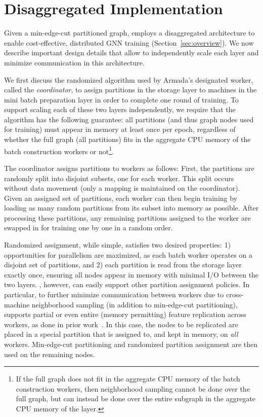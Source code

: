 \section{Disaggregated Implementation}
\label{sec:implementation}
Given a min-edge-cut partitioned graph, \systemname employs a disaggregated architecture to enable cost-effective, distributed GNN training (Section~\ref{sec:overview}). We now describe important design details that allow \systemname to independently scale each layer and minimize communication in this architecture. 



We first discuss the randomized algorithm used by Armada's designated worker, called the \textit{coordinator}, to assign partitions in the storage layer to machines in the mini batch preparation layer in order to complete one round of training. To support scaling each of these two layers independently, we require that the algorithm has the following guarantee: all partitions (and thus graph nodes used for training) must appear in memory at least once per epoch, regardless of whether the full graph (all partitions) fits in the aggregate CPU memory of the batch construction workers or not\footnote{If the full graph does not fit in the aggregate CPU memory of the batch construction workers, then neighborhood sampling cannot be done over the full graph, but can instead be done over the entire subgraph in the aggregate CPU memory of the layer.}.

The coordinator assigns partitions to workers as follows: First, the partitions are randomly split into disjoint subsets, one for each worker. This split occurs without data movement (only a mapping is maintained on the coordinator). Given an assigned set of partitions, each worker can then begin training by loading as many random partitions from its subset into memory as possible. After processing these partitions, any remaining partitions assigned to the worker are swapped in for training one by one in a random order. 

Randomized assignment, while simple, satisfies two desired properties: 1) opportunities for parallelism are maximized, as each batch worker operates on a disjoint set of partitions, and 2) each partition is read from the storage layer exactly once, ensuring all nodes appear in memory with minimal I/O between the two layers. \systemname, however, can easily support other partition assignment policies. In particular, to further minimize communication between workers due to cross-machine neighborhood sampling (in addition to min-edge-cut partitioning), \systemname supports partial or even entire (memory permitting) feature replication across workers, as done in prior work~\cite{cao2023communication, salient++}. In this case, the nodes to be replicated are placed in a special partition that is assigned to, and kept in memory, on \textit{all} workers. Min-edge-cut partitioning and randomized partition assignment are then used on the remaining nodes. 



